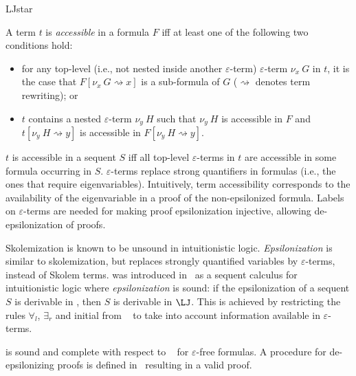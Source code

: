 \begin{entry}{LJstar}
\begin{clarifications}
A term $t$ is \emph{accessible} in a formula $F$ iff at least one of the
following two conditions hold: 
\begin{itemize}
  \item for any top-level (i.e., not nested inside another $\varepsilon$-term)
  $\varepsilon$-term $\nu_x~G$ in $t$, it is the case that $F[\nu_x~G
  \rightsquigarrow x]$ is a sub-formula of $G$ ($\rightsquigarrow$ denotes term
  rewriting); or

  \item $t$ contains a nested $\varepsilon$-term $\nu_y~H$ such that $\nu_y~H$
  is accessible in $F$ and $t[\nu_y~H \rightsquigarrow y]$ is accessible in
  $F[\nu_y~H \rightsquigarrow y]$.
\end{itemize}
$t$ is accessible in a sequent $S$ iff all top-level
$\varepsilon$-terms in $t$ are accessible in some formula occurring in $S$.
%
$\varepsilon$-terms replace strong quantifiers in formulas (i.e., the ones
that require eigenvariables).
Intuitively, term accessibility corresponds to the availability of the
eigenvariable in a proof of the non-epsilonized formula.
%
Labels on $\varepsilon$-terms are needed for making proof epsilonization injective, allowing de-epsilonization of proofs.
\end{clarifications}

\begin{history}
Skolemization is known to be unsound in intuitionistic logic. \emph{Epsilonization} is similar to skolemization, but replaces strongly quantified variables by $\varepsilon$-terms, instead of Skolem terms. \LJstar was introduced in~\cite{Reis2016} as a sequent calculus for
intuitionistic logic where \emph{epsilonization} is sound: if the
epsilonization of a sequent $S$ is derivable in \LJstar, then $S$ is derivable in $\LJ$.
%
This is achieved by restricting the rules $\forall_l$, $\exists_r$ and initial
from \LJ~ to take into account information available in
$\varepsilon$-terms.
\end{history}

\begin{technicalities}
\LJstar is sound and complete with respect to \LJ~ for
$\varepsilon$-free formulas. A procedure for de-epsilonizing \LJstar proofs is
defined in~\cite{Reis2016} resulting in a valid \LJ proof.
\end{technicalities}

\end{entry}
